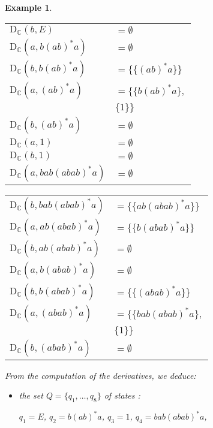 \documentclass{article}
\newtheorem{example}{Example}
\begin{document}
\begin{example}
      \begin{minipage}{0.49\linewidth}
      \begin{tabular}{l@{}l}
        $\mathrm{D}_\mathbb{C}(b,E)$ & $=\emptyset$\\
        $\mathrm{D}_\mathbb{C}(a,b(ab)^*a)$ & $=\emptyset$\\
        $\mathrm{D}_\mathbb{C}(b,b(ab)^*a)$ & $=\{\{(ab)^*a\}\}$\\
        $\mathrm{D}_\mathbb{C}(a,(ab)^*a)$ & $=\{\{b(ab)^*a\},$\\
        & $\{1\}\}$\\
        $\mathrm{D}_\mathbb{C}(b,(ab)^*a)$ & $=\emptyset$\\
        $\mathrm{D}_\mathbb{C}(a,1)$ & $=\emptyset$\\
        $\mathrm{D}_\mathbb{C}(b,1)$ & $=\emptyset$\\
        $\mathrm{D}_\mathbb{C}(a,bab(abab)^*a)$ & $=\emptyset$\\
      \end{tabular}
      \end{minipage}
      \hfill      
      \begin{minipage}{0.49\linewidth}
      \begin{tabular}{l@{}l}
        $\mathrm{D}_\mathbb{C}(b,bab(abab)^*a)$ & $=\{\{ab(abab)^*a\}\}$\\
        $\mathrm{D}_\mathbb{C}(a,ab(abab)^*a)$ & $=\{\{b(abab)^*a\}\}$\\
        $\mathrm{D}_\mathbb{C}(b,ab(abab)^*a)$ & $=\emptyset$\\
        $\mathrm{D}_\mathbb{C}(a,b(abab)^*a)$ & $=\emptyset$\\
        $\mathrm{D}_\mathbb{C}(b,b(abab)^*a)$ & $=\{\{(abab)^*a\}\}$\\
        $\mathrm{D}_\mathbb{C}(a,(abab)^*a)$ & $=\{\{bab(abab)^*a\},$\\
        &$ \{1\}\}$\\
        $\mathrm{D}_\mathbb{C}(b,(abab)^*a)$ & $=\emptyset$\\
      \end{tabular}
      \end{minipage}
      
      From the computation of the derivatives, we deduce:
      
      \begin{itemize}
      \item the set $Q=\{q_1,\ldots,q_8\}$ of states :
      
      \centerline{
        $q_1 =E$, $q_2 =b(ab)^*a$, $q_3 =1$, $q_4 =bab(abab)^*a$,
      }
      

\end{itemize}
\end{example}
\end{document}
